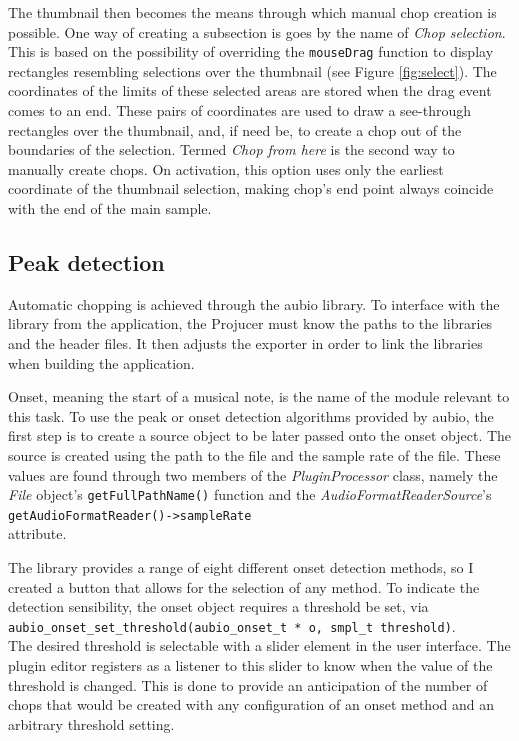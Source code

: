 \documentclass[12pt, a4paper, hidelinks]{report}
\begin{document}
	The thumbnail then becomes the means through which manual chop creation is possible. One way of creating a subsection is goes by the name of \textit{Chop selection}. This is based on the possibility of overriding the \texttt{mouseDrag} function to display rectangles resembling selections over the thumbnail (see Figure \ref{fig:select}). The coordinates of the limits of these selected areas are stored when the drag event comes to an end. These pairs of coordinates are used to draw a see-through rectangles over the thumbnail, and, if need be, to create a chop out of the boundaries of the selection. Termed \textit{Chop from here} is the second way to manually create chops. On activation, this option uses only the earliest coordinate of the thumbnail selection, making chop's end point always coincide with the end of the main sample. \par
	
	\subsection{Peak detection}
	Automatic chopping is achieved through the aubio library. To interface with the library from the application, the Projucer must know the paths to the libraries and the header files. It then adjusts the exporter in order to link the libraries when building the application.\par    
	Onset, meaning the start of a musical note, is the name of the module relevant to this task. To use the peak or onset detection algorithms provided by aubio, the first step is to create a source object to be later passed onto the onset object. The source is created using the path to the file and the sample rate of the file. These values are found through two members of the \textit{PluginProcessor} class, namely the \textit{File} object's  \texttt{getFullPathName()} function and the \textit{AudioFormatReaderSource}'s \texttt{getAudioFormatReader()->sampleRate} \\attribute. \par
	
	The library provides a range of eight different onset detection methods, so I created a button that allows for the selection of any method. To indicate the detection sensibility, the onset object requires a threshold be set, via\\
	\texttt{aubio\_onset\_set\_threshold(aubio\_onset\_t * o, smpl\_t threshold)}.\\
	The desired threshold is selectable with a slider element in the user interface. The plugin editor registers as a listener to this slider to know when the value of the threshold is changed. This is done to provide an anticipation of the number of chops that would be created with any configuration of an onset method and an arbitrary threshold setting. \par
	
\end{document}
